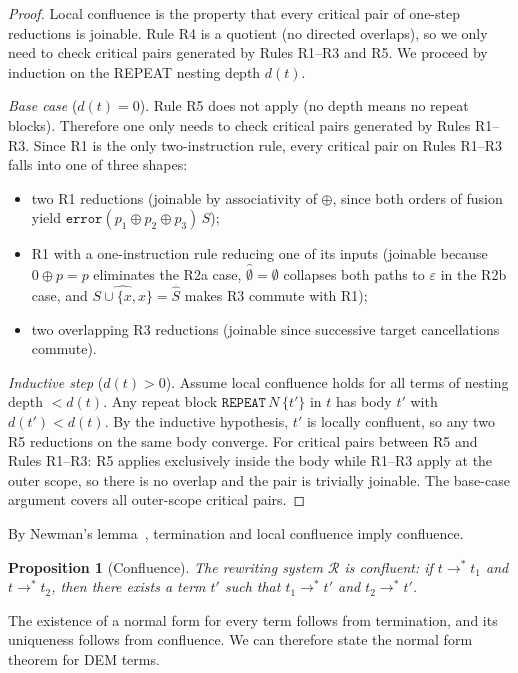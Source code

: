 \documentclass[11pt,a4paper]{article}
\newtheorem{proposition}[theorem]{Proposition}
\newcommand{\R}{\mathcal{R}}          %
\newcommand{\xorfold}{\oplus}          %
\newcommand{\tomany}{\to^{*}}
\begin{document}
\begin{proof}
Local confluence is the property that every critical pair of one-step reductions is joinable. Rule R4 is a quotient (no directed overlaps), so we only need to check critical pairs generated by Rules R1--R3 and R5. We proceed by induction on the REPEAT nesting depth $d(t)$. 

\textit{Base case} ($d(t) = 0$). Rule R5 does not apply (no depth means no repeat blocks). Therefore one only needs to check critical pairs generated by Rules R1--R3. Since R1 is the only two-instruction rule, every critical pair on Rules R1--R3 falls into one of three shapes:
\begin{itemize}
\item two R1 reductions (joinable by associativity of $\xorfold$, since both orders of fusion yield $\mathtt{error}(p_1\xorfold p_2\xorfold p_3)\,S$);
\item R1 with a one-instruction rule reducing one of its inputs (joinable because $0\xorfold p = p$ eliminates the R2a case, $\widehat{\emptyset}=\emptyset$ collapses both paths to $\varepsilon$ in the R2b case, and $\widehat{S\cup\{x,x\}}=\widehat{S}$ makes R3 commute with R1);
\item two overlapping R3 reductions (joinable since successive target cancellations commute).
\end{itemize}

\textit{Inductive step} ($d(t) > 0$). Assume local confluence holds for all terms of nesting depth $< d(t)$. Any repeat block $\mathtt{REPEAT}\,N\,\{t'\}$ in $t$ has body $t'$ with $d(t') < d(t)$. By the inductive hypothesis, $t'$ is locally confluent, so any two R5 reductions on the same body converge. For critical pairs between R5 and Rules R1--R3: R5 applies exclusively inside the body while R1--R3 apply at the outer scope, so there is no overlap and the pair is trivially joinable. The base-case argument covers all outer-scope critical pairs.
\end{proof}

By Newman's lemma~\cite{newman1942, baader1998term}, termination and local confluence imply confluence.

\begin{proposition}[Confluence]
\label{prop:confluence}
The rewriting system $\R$ is confluent: if $t \tomany t_1$ and $t \tomany t_2$, then there exists a term $t'$ such that $t_1 \tomany t'$ and $t_2 \tomany t'$.
\end{proposition}

The existence of a normal form for every term follows from termination, and its uniqueness follows from confluence. We can therefore state the normal form theorem for DEM terms.
\end{document}
